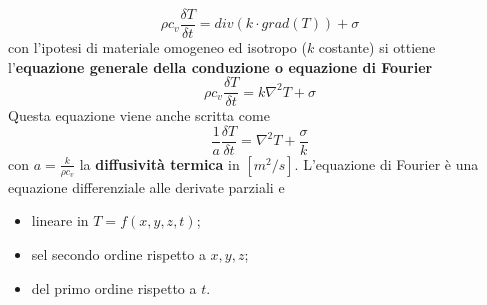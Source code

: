 \[
    \rho c_v \frac{\delta T}{\delta t} = div (k \cdot grad(T)) + \sigma
\]
con l'ipotesi di materiale omogeneo ed isotropo ($k$ costante) si ottiene l'\textbf{equazione generale della conduzione o equazione di Fourier}
\[
    \rho c_v \frac{\delta T}{\delta t} = k \nabla^2T + \sigma
\]
Questa equazione viene anche scritta come 
\[
    \frac{1}{a} \frac{\delta T}{\delta t} = \nabla^2 T + \frac{\sigma}{k}
\]
con $a = \frac{k}{\rho c_v}$ la \textbf{diffusività termica} in $[m^2/s]$.
\newline
\newline
L'equazione di Fourier è una equazione differenziale alle derivate parziali e 
\begin{itemize}
    \item lineare in $T= f(x,y,z,t)$;
    \item sel secondo ordine rispetto a $x,y,z$;
    \item del primo ordine rispetto a $t$.
\end{itemize}
